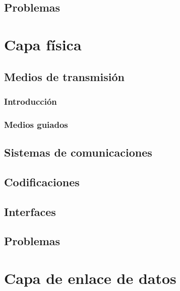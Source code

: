 \documentclass[
]{book}
\begin{document}
\hypertarget{problemas}{%
\section{Problemas}\label{problemas}}

\hypertarget{capa-fuxedsica}{%
\chapter{Capa física}\label{capa-fuxedsica}}

\hypertarget{medios-de-transmisiuxf3n}{%
\section{Medios de transmisión}\label{medios-de-transmisiuxf3n}}

\hypertarget{introducciuxf3n}{%
\subsection{Introducción}\label{introducciuxf3n}}

\hypertarget{medios-guiados}{%
\subsection{Medios guiados}\label{medios-guiados}}

\hypertarget{sistemas-de-comunicaciones-1}{%
\section{Sistemas de comunicaciones}\label{sistemas-de-comunicaciones-1}}

\hypertarget{codificaciones}{%
\section{Codificaciones}\label{codificaciones}}

\hypertarget{interfaces}{%
\section{Interfaces}\label{interfaces}}

\hypertarget{problemas-1}{%
\section{Problemas}\label{problemas-1}}

\hypertarget{capa-de-enlace-de-datos}{%
\chapter{Capa de enlace de datos}\label{capa-de-enlace-de-datos}}
\end{document}
